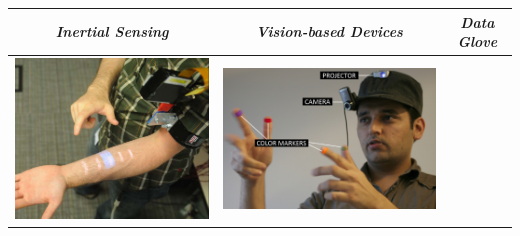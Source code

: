 \begin{table}[h!]
\begin{center}
  \begin{tabular}{ | c | c | c | }
    \hline
    \textit{Inertial Sensing} & \textit{Vision-based Devices} & \textit{Data Glove} \\ 
    \hline
    \begin{minipage}{.3\textwidth}
    \vspace*{0.1cm}
      \includegraphics[scale=0.4]{Bilder/Hauptteil/skinput}
    \vspace*{0.1cm}
    \end{minipage}
    &
    \begin{minipage}{.3\textwidth}
      \includegraphics[scale=0.4]{Bilder/Hauptteil/sixthsense}
    \end{minipage}
    &
    \begin{minipage}{.3\textwidth}
    \vspace*{0.1cm}

\end{minipage}
\end{tabular}
\end{center}
\end{table}

